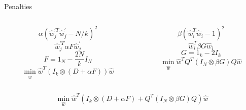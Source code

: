 	\begin{frame}{Penalties}
		\begin{columns}
			\begin{column}{0.5\textwidth}
				$$\alpha\left(\hat{w}_{j}^{\prime T} \hat{w}_{j}^{\prime}-N / k\right)^{2}$$
				\pause
				$$\hat{w}_{j}^{\prime T} \alpha F \hat{w}_{j}^{\prime}$$
				$$F=1_{N}-\frac{2 N}{k} I_{N}$$
				\pause
				$$\min _{\hat{w}} \hat{w}^{T}\left(I_{k} \otimes(D+\alpha F)\right) \hat{w}$$
				\pause
			\end{column}
			\begin{column}{0.5\textwidth}  
				$$\beta\left(\hat{w}_{i}^{T} \hat{w}_{i}-1\right)^{2}$$
				\pause
				$$\hat{w}_{i}^{T} \beta G \hat{w}_{i}$$
				$$G=1_{k}-2 I_{k}$$
				\pause
				$$\min_{\hat{w}}\hat{w}^{T} Q^{T}\left(I_{N} \otimes \beta G\right) Q \hat{w}$$
				\pause
			\end{column}
		\end{columns}
		\bigbreak
		$$\min_{\hat{w}} \hat{w}^{T}\left(I_{k} \otimes(D+\alpha F)+Q^{T}\left(I_{N} \otimes \beta G\right) Q\right) \hat{w}$$
	\end{frame}


	
	

